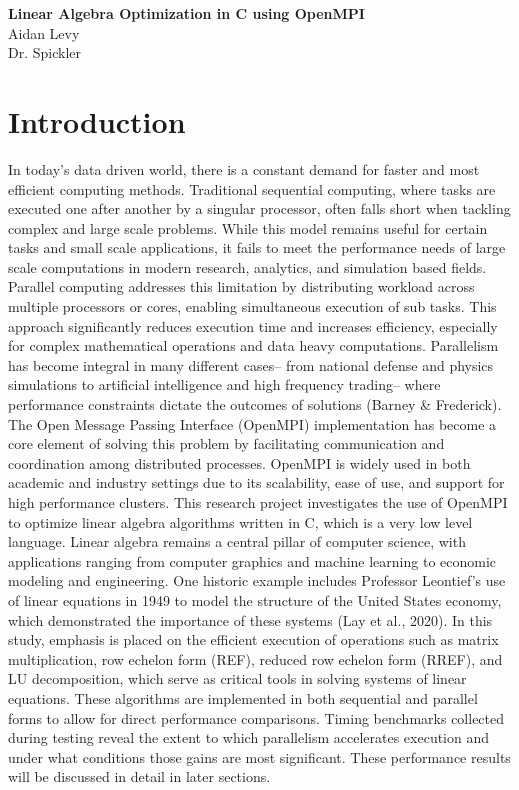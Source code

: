 \documentclass[12pt]{article}
\begin{document}
\begin{center}
    \LARGE \textbf{Linear Algebra Optimization in C using OpenMPI} \\
    \vspace{0.3cm}
    \large Aidan Levy \\
    Dr. Spickler \\
    \date{\today}
\end{center}

\newpage

\section{Introduction}
In today’s data driven world, there is a constant demand for faster and most efficient computing methods. Traditional sequential computing, where tasks are executed one after another by a singular processor, often falls short when tackling complex and large scale problems. While this model remains useful for certain tasks and small scale applications, it fails to meet the performance needs of large scale computations in modern research, analytics, and simulation based fields. 
Parallel computing addresses this limitation by distributing workload across multiple processors or cores, enabling simultaneous execution of sub tasks. This approach significantly reduces execution time and increases efficiency, especially for complex mathematical operations and data heavy computations. Parallelism has become integral in many different cases-- from national defense and physics simulations to artificial intelligence and high frequency trading-- where performance constraints dictate the outcomes of solutions (Barney \& Frederick). The Open Message Passing Interface (OpenMPI) implementation has become a core element of solving this problem by facilitating communication and coordination among distributed processes. OpenMPI is widely used in both academic and industry settings due to its scalability, ease of use, and support for high performance clusters.
This research project investigates the use of OpenMPI to optimize linear algebra algorithms written in C, which is a very low level language. Linear algebra remains a central pillar of computer science, with applications ranging from computer graphics and machine learning to economic modeling and engineering. One historic example includes Professor Leontief’s use of linear equations in 1949 to model the structure of the United States economy, which demonstrated the importance of these systems (Lay et al., 2020). In this study, emphasis is placed on the efficient execution of operations such as matrix multiplication, row echelon form (REF), reduced row echelon form (RREF), and LU decomposition, which serve as critical tools in solving systems of linear equations. These algorithms are implemented in both sequential and parallel forms to allow for direct performance comparisons. Timing benchmarks collected during testing reveal the extent to which parallelism accelerates execution and under what conditions those gains are most significant. These performance results will be discussed in detail in later sections. 
\end{document}
